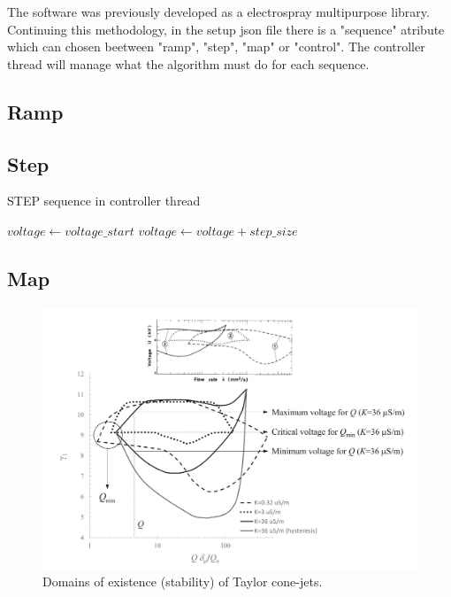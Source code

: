     The software was previously developed as a electrospray multipurpose library\cite{Monica}. 
    Continuing this methodology, in the setup json file there is a "sequence" atribute which can chosen beetween "ramp", "step", "map" or "control".
    The controller thread will manage what the algorithm must do for each sequence.

\subsection{Ramp}



\subsection{Step}


\begin{algorithm}
    \caption{STEP sequence in controller thread}\label{alg:stepping_algorithm}
    \begin{algorithmic}
        \State $voltage \gets voltage\_start$
         
            \State {}
            \State {}
            \State $voltage \gets voltage + step\_size$
        \EndWhile
    \EndProcedure

    \end{algorithmic}
\end{algorithm}

\subsection{Map}

    \begin{figure}[H]
        \center
        \includegraphics[width=13cm]{Figuras/ganan_calvo_map.png}
        \caption{Domains of existence (stability) of Taylor cone-jets. \cite{gananCalvo} }
        \label{fig:ganan_calvo_fig}
    \end{figure}


